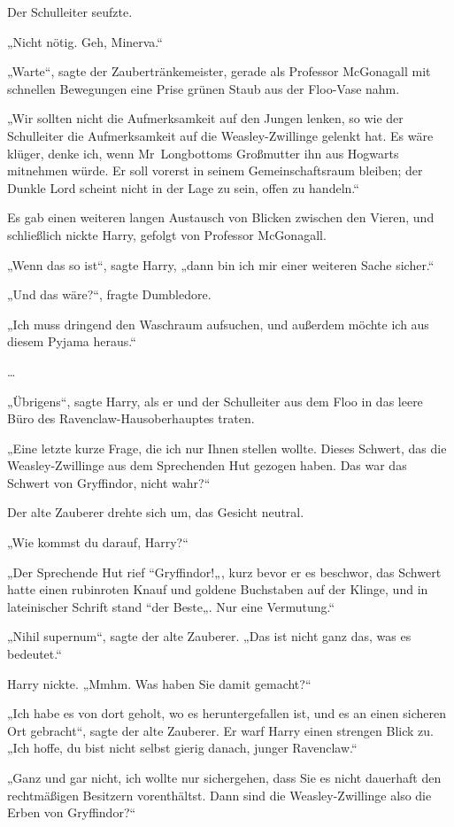 {Der Schulleiter seufzte.

„Nicht nötig. Geh, Minerva.“

„Warte“, sagte der Zaubertränkemeister, gerade als Professor McGonagall mit schnellen Bewegungen eine Prise grünen Staub aus der Floo-Vase nahm.

„Wir sollten nicht die Aufmerksamkeit auf den Jungen lenken, so wie der Schulleiter die Aufmerksamkeit auf die Weasley-Zwillinge gelenkt hat. Es wäre klüger, denke ich, wenn Mr~Longbottoms Großmutter ihn aus Hogwarts mitnehmen würde. Er soll vorerst in seinem Gemeinschaftsraum bleiben; der Dunkle Lord scheint nicht in der Lage zu sein, offen zu handeln.“

Es gab einen weiteren langen Austausch von Blicken zwischen den Vieren, und schließlich nickte Harry, gefolgt von Professor McGonagall.

„Wenn das so ist“, sagte Harry, „dann bin ich mir einer weiteren Sache sicher.“

„Und das wäre?“, fragte Dumbledore.

„Ich muss dringend den Waschraum aufsuchen, und außerdem möchte ich aus diesem Pyjama heraus.“

…

„Übrigens“, sagte Harry, als er und der Schulleiter aus dem Floo in das leere Büro des Ravenclaw-Hausoberhauptes traten.

„Eine letzte kurze Frage, die ich nur Ihnen stellen wollte. Dieses Schwert, das die Weasley-Zwillinge aus dem Sprechenden Hut gezogen haben. Das war das Schwert von Gryffindor, nicht wahr?“

Der alte Zauberer drehte sich um, das Gesicht neutral.

„Wie kommst du darauf, Harry?“

„Der Sprechende Hut rief “Gryffindor!„, kurz bevor er es beschwor, das Schwert hatte einen rubinroten Knauf und goldene Buchstaben auf der Klinge, und in lateinischer Schrift stand “der Beste„. Nur eine Vermutung.“

„Nihil supernum“, sagte der alte Zauberer. „Das ist nicht ganz das, was es bedeutet.“

Harry nickte. „Mmhm. Was haben Sie damit gemacht?“

„Ich habe es von dort geholt, wo es heruntergefallen ist, und es an einen sicheren Ort gebracht“, sagte der alte Zauberer. Er warf Harry einen strengen Blick zu. „Ich hoffe, du bist nicht selbst gierig danach, junger Ravenclaw.“

„Ganz und gar nicht, ich wollte nur sichergehen, dass Sie es nicht dauerhaft den rechtmäßigen Besitzern vorenthältst. Dann sind die Weasley-Zwillinge also die Erben von Gryffindor?“

}
